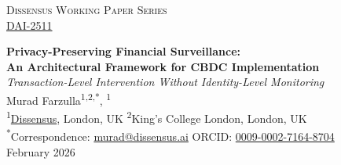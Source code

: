 \documentclass[11pt]{article}
\newcommand{\papernum}{DAI-2511}              %
\newcommand{\paperdate}{February 2026}
\newcommand{\paperurl}{https://systems.ac/2/DAI-2511}  %
\begin{document}
\thispagestyle{firstpage}

\begin{center}
{\small\textsc{Dissensus Working Paper Series}}\\[0.2em]
{\small \href{\paperurl}{\papernum}}
\end{center}

\vspace{1.5em}

\begin{center}
{\LARGE\bfseries Privacy-Preserving Financial Surveillance:\\An Architectural Framework for CBDC Implementation}\\[0.5em]
{\large\itshape Transaction-Level Intervention Without Identity-Level Monitoring}\\[1.5em]

{\large Murad Farzulla}\textsuperscript{1,2,*}, \textsuperscript{1}\\[0.8em]

{\small
  \textsuperscript{1}\href{https://dissensus.ai}{Dissensus}, London, UK \quad
  \textsuperscript{2}King's College London, London, UK%
}\\[0.5em]

{\footnotesize
  \textsuperscript{*}Correspondence: \href{mailto:murad@dissensus.ai}{murad@dissensus.ai}
  \quad
  ORCID: \href{https://orcid.org/0009-0002-7164-8704}{0009-0002-7164-8704}%
}\\[0.3em]
{\footnotesize \paperdate}
\end{center}
\end{document}
